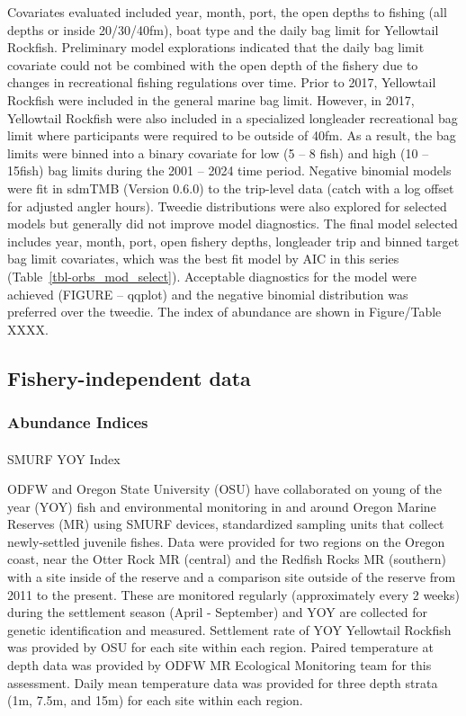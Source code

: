 \documentclass[
]{scrartcl}
\makeatletter
\let\oldparagraph\paragraph
\renewcommand{\paragraph}{
    \@ifstar
      \xxxParagraphStar
      \xxxParagraphNoStar
  }
\newcommand{\xxxParagraphStar}[1]{\oldparagraph*{#1}\mbox{}}
\newcommand{\xxxParagraphNoStar}[1]{\oldparagraph{#1}\mbox{}}
\makeatother
\begin{document}
Covariates evaluated included year, month, port, the open depths to
fishing (all depths or inside 20/30/40fm), boat type and the daily bag
limit for Yellowtail Rockfish. Preliminary model explorations indicated
that the daily bag limit covariate could not be combined with the open
depth of the fishery due to changes in recreational fishing regulations
over time. Prior to 2017, Yellowtail Rockfish were included in the
general marine bag limit. However, in 2017, Yellowtail Rockfish were
also included in a specialized longleader recreational bag limit where
participants were required to be outside of 40fm. As a result, the bag
limits were binned into a binary covariate for low (5 -- 8 fish) and
high (10 -- 15fish) bag limits during the 2001 -- 2024 time period.
Negative binomial models were fit in sdmTMB (Version 0.6.0) to the
trip-level data (catch with a log offset for adjusted angler hours).
Tweedie distributions were also explored for selected models but
generally did not improve model diagnostics. The final model selected
includes year, month, port, open fishery depths, longleader trip and
binned target bag limit covariates, which was the best fit model by AIC
in this series (Table~\ref{tbl-orbs_mod_select}). Acceptable diagnostics
for the model were achieved (FIGURE -- qqplot) and the negative binomial
distribution was preferred over the tweedie. The index of abundance are
shown in Figure/Table XXXX.

\subsection{Fishery-independent data}\label{fishery-independent-data}

\subsubsection{Abundance Indices}\label{abundance-indices-1}

\paragraph{SMURF YOY Index}\label{smurf-yoy-index}

ODFW and Oregon State University (OSU) have collaborated on young of the
year (YOY) fish and environmental monitoring in and around Oregon Marine
Reserves (MR) using SMURF devices, standardized sampling units that
collect newly-settled juvenile fishes. Data were provided for two
regions on the Oregon coast, near the Otter Rock MR (central) and the
Redfish Rocks MR (southern) with a site inside of the reserve and a
comparison site outside of the reserve from 2011 to the present. These
are monitored regularly (approximately every 2 weeks) during the
settlement season (April - September) and YOY are collected for genetic
identification and measured. Settlement rate of YOY Yellowtail Rockfish
was provided by OSU for each site within each region. Paired temperature
at depth data was provided by ODFW MR Ecological Monitoring team for
this assessment. Daily mean temperature data was provided for three
depth strata (1m, 7.5m, and 15m) for each site within each region.
\end{document}
